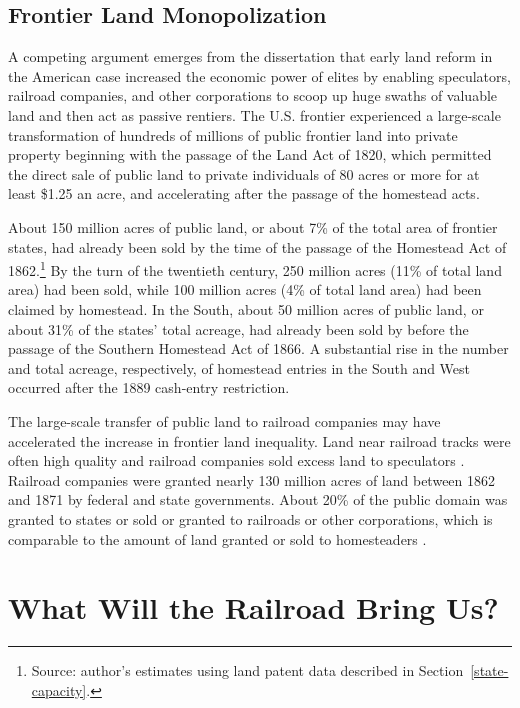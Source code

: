 \subsection{Frontier Land Monopolization} 

A competing argument emerges from the dissertation that early land reform in the American case increased the economic power of elites by enabling speculators, railroad companies, and other corporations to scoop up huge swaths of valuable land and then act as passive rentiers.  The U.S. frontier experienced a large-scale transformation of hundreds of millions of public frontier land into private property beginning with the passage of the Land Act of 1820, which permitted the direct sale of public land to private individuals of 80 acres or more for at least \$1.25 an acre, and accelerating after the passage of the homestead acts. 

About 150 million acres of public land, or about 7\% of the total area of frontier states, had already been sold by the time of the passage of the Homestead Act of 1862.\footnote{Source: author's estimates using land patent data described in Section~\ref{state-capacity}.} By the turn of the twentieth century, 250 million acres (11\% of total land area) had been sold, while 100 million acres (4\% of total land area) had been claimed by homestead. In the South, about 50 million acres of public land, or about 31\% of the states' total acreage, had already been sold by before the passage of the Southern Homestead Act of 1866. A substantial rise in the number and total acreage, respectively, of homestead entries in the South and West occurred after the 1889 cash-entry restriction.

The large-scale transfer of public land to railroad companies may have accelerated the increase in frontier land inequality. Land near railroad tracks were often high quality and railroad companies sold excess land to speculators \citep{murtazashvili2013political}. Railroad companies were granted nearly 130 million acres of land between 1862 and 1871 by federal and state governments. About 20\% of the public domain was granted to states or sold or granted to railroads or other corporations, which is comparable to the amount of land granted or sold to homesteaders \citep{shanks2005homestead}.
 
\section{What Will the Railroad Bring Us?} 

